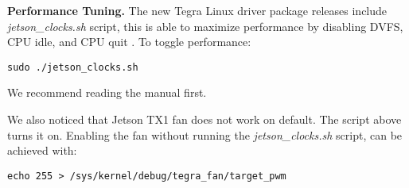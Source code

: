 \textbf{Performance Tuning.}
The new Tegra Linux driver package releases include \textit{jetson\_clocks.sh} script, this is able to maximize performance by disabling DVFS, CPU idle, and CPU quit \cite{tegradriverpack242}. To toggle performance:
\begin{lstlisting} 
sudo ./jetson_clocks.sh
\end{lstlisting}
We recommend reading the manual first.

We also noticed that Jetson TX1 fan does not work on default. The script above turns it on. Enabling the fan without running the \textit{jetson\_clocks.sh} script, can be achieved with:
\begin{lstlisting} 
echo 255 > /sys/kernel/debug/tegra_fan/target_pwm
\end{lstlisting}
